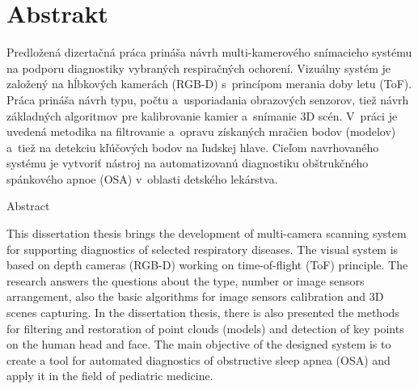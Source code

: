 
\chapter*{Abstrakt} \label{kap:Abstrakt}

Predložená dizertačná práca prináša návrh multi-kamerového snímacieho systému na podporu diagnostiky vybraných respiračných ochorení. Vizuálny systém je založený na hĺbkových kamerách (RGB-D) s princípom merania doby letu (ToF). Práca prináša návrh typu, počtu a usporiadania obrazových senzorov, tiež návrh základných algoritmov pre kalibrovanie kamier a snímanie 3D scén. V práci je uvedená metodika na filtrovanie a opravu získaných mračien bodov (modelov) a tiež na detekciu kľúčových bodov na ľudskej hlave. Cieľom navrhovaného systému je vytvoriť nástroj na automatizovanú diagnostiku obštrukčného spánkového apnoe (OSA) v oblasti detského lekárstva. \newline


{\LARGE Abstract}

This dissertation thesis brings the development of multi-camera scanning system for supporting diagnostics of selected respiratory diseases. The visual system is based on depth cameras (RGB-D) working on time-of-flight (ToF) principle. The research answers the questions about the type, number or image sensors arrangement, also the basic algorithms for image sensors calibration and 3D scenes capturing. In the dissertation thesis, there is also presented the methods for filtering and restoration of point clouds (models) and detection of key points on the human head and face. The main objective of the designed system is to create a tool for automated diagnostics of obstructive sleep apnea (OSA) and apply it in the field of pediatric medicine.